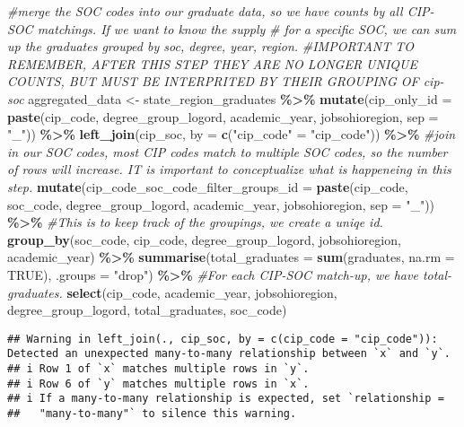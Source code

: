 \documentclass[
]{article}
\newenvironment{Shaded}{\begin{snugshade}}{\end{snugshade}}
\newcommand{\AttributeTok}[1]{\textcolor[rgb]{0.13,0.29,0.53}{#1}}
\newcommand{\CommentTok}[1]{\textcolor[rgb]{0.56,0.35,0.01}{\textit{#1}}}
\newcommand{\ConstantTok}[1]{\textcolor[rgb]{0.56,0.35,0.01}{#1}}
\newcommand{\FunctionTok}[1]{\textcolor[rgb]{0.13,0.29,0.53}{\textbf{#1}}}
\newcommand{\NormalTok}[1]{#1}
\newcommand{\OtherTok}[1]{\textcolor[rgb]{0.56,0.35,0.01}{#1}}
\newcommand{\SpecialCharTok}[1]{\textcolor[rgb]{0.81,0.36,0.00}{\textbf{#1}}}
\newcommand{\StringTok}[1]{\textcolor[rgb]{0.31,0.60,0.02}{#1}}
\begin{document}
\begin{Shaded}
\begin{Highlighting}[]
\CommentTok{\#merge the SOC codes into our graduate data, so we have counts by all CIP{-}SOC matchings. If we want to know the supply}
\CommentTok{\# for a specific SOC, we can sum up the graduates grouped by soc, degree, year, region. }
\CommentTok{\#IMPORTANT TO REMEMBER, AFTER THIS STEP THEY ARE NO LONGER UNIQUE COUNTS, BUT MUST BE INTERPRITED BY THEIR GROUPING OF cip{-}soc}
\NormalTok{aggregated\_data }\OtherTok{\textless{}{-}}\NormalTok{ state\_region\_graduates }\SpecialCharTok{\%\textgreater{}\%}
  \FunctionTok{mutate}\NormalTok{(}\AttributeTok{cip\_only\_id =} \FunctionTok{paste}\NormalTok{(cip\_code, degree\_group\_logord, academic\_year, jobsohioregion, }\AttributeTok{sep =} \StringTok{"\_"}\NormalTok{)) }\SpecialCharTok{\%\textgreater{}\%}
  \FunctionTok{left\_join}\NormalTok{(cip\_soc, }\AttributeTok{by =} \FunctionTok{c}\NormalTok{(}\StringTok{"cip\_code"} \OtherTok{=} \StringTok{"cip\_code"}\NormalTok{)) }\SpecialCharTok{\%\textgreater{}\%} \CommentTok{\#join in our SOC codes, most CIP codes match to multiple SOC codes, so the number of rows will increase. IT is important to conceptualize what is happeneing in this step. }
    \FunctionTok{mutate}\NormalTok{(}\AttributeTok{cip\_code\_soc\_code\_filter\_groups\_id =} \FunctionTok{paste}\NormalTok{(cip\_code, soc\_code, degree\_group\_logord, academic\_year, jobsohioregion, }\AttributeTok{sep =} \StringTok{"\_"}\NormalTok{)) }\SpecialCharTok{\%\textgreater{}\%} \CommentTok{\#This is to keep track of the groupings, we create a uniqe id. }
  \FunctionTok{group\_by}\NormalTok{(soc\_code, cip\_code, degree\_group\_logord, jobsohioregion, academic\_year) }\SpecialCharTok{\%\textgreater{}\%}
  \FunctionTok{summarise}\NormalTok{(}\AttributeTok{total\_graduates =} \FunctionTok{sum}\NormalTok{(graduates, }\AttributeTok{na.rm =} \ConstantTok{TRUE}\NormalTok{), }\AttributeTok{.groups =} \StringTok{"drop"}\NormalTok{) }\SpecialCharTok{\%\textgreater{}\%}
  \CommentTok{\#For each CIP{-}SOC match{-}up, we have total{-}graduates. }
   \FunctionTok{select}\NormalTok{(cip\_code, academic\_year, jobsohioregion, degree\_group\_logord, total\_graduates, soc\_code)}
\end{Highlighting}
\end{Shaded}

\begin{verbatim}
## Warning in left_join(., cip_soc, by = c(cip_code = "cip_code")): Detected an unexpected many-to-many relationship between `x` and `y`.
## i Row 1 of `x` matches multiple rows in `y`.
## i Row 6 of `y` matches multiple rows in `x`.
## i If a many-to-many relationship is expected, set `relationship =
##   "many-to-many"` to silence this warning.
\end{verbatim}
\end{document}
